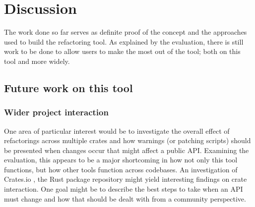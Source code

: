 \chapter{Discussion}\label{C:future}

The work done so far serves as definite proof of the concept and the approaches used to build the refactoring tool. As explained by the evaluation, there is still work to be done to allow users to make the most out of the tool; both on this tool and more widely.



\section{Future work on this tool}
\subsection{Wider project interaction}

One area of particular interest would be to investigate the overall effect of refactorings across multiple crates and how warnings (or patching scripts) should be presented when changes occur that might affect a public API. Examining the evaluation, this appears to be a major shortcoming in how not only this tool functions, but how other tools function across codebases. An investigation of Crates.io \cite{cratesio15}, the Rust package repository might yield interesting findings on crate interaction. One goal might be to describe the best steps to take when an API must change and how that should be dealt with from a community perspective. 

